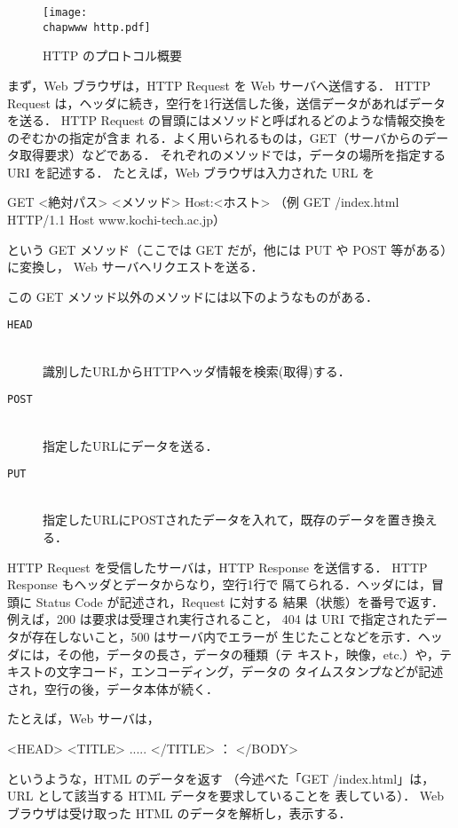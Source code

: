 \begin{figure}[ht]
 \begin{center}
  \texttt{[image: \\chapwww http.pdf]}
  \caption{HTTP のプロトコル概要}
  \label{fig:04:http}
 \end{center}
\end{figure}

まず，Web ブラウザは，HTTP Request を Web サーバへ送信する．
HTTP Request は，ヘッダに続き，空行を1行送信した後，送信データがあればデータを送る．
HTTP Request の冒頭にはメソッドと呼ばれるどのような情報交換をのぞむかの指定が含ま
れる．よく用いられるものは，GET（サーバからのデータ取得要求）などである．
それぞれのメソッドでは，データの場所を指定する URI を記述する．
たとえば，Web ブラウザは入力された URL を
\begin{cli}
GET <絶対パス> <メソッド> Host:<ホスト>
（例 GET /index.html HTTP/1.1 Host www.kochi-tech.ac.jp）
\end{cli}
という GET メソッド（ここでは GET だが，他には PUT や POST 等がある）に変換し，
Web サーバへリクエストを送る．

この GET メソッド以外のメソッドには以下のようなものがある．
\begin{description}
 \item[\texttt{HEAD}] \ \\
       識別したURLからHTTPヘッダ情報を検索(取得)する．
 \item[\texttt{POST}] \ \\
       指定したURLにデータを送る．
 \item[\texttt{PUT}]  \ \\
       指定したURLにPOSTされたデータを入れて，既存のデータを置き換える．
\end{description}

HTTP Request を受信したサーバは，HTTP Response を送信する．
HTTP Response もヘッダとデータからなり，空行1行で
隔てられる．ヘッダには，冒頭に Status Code が記述され，Request に対する
結果（状態）を番号で返す．例えば，200 は要求は受理され実行されること，
404 は URI で指定されたデータが存在しないこと，500 はサーバ内でエラーが
生じたことなどを示す．ヘッダには，その他，データの長さ，データの種類（テ
キスト，映像，etc.）や，テキストの文字コード，エンコーディング，データの
タイムスタンプなどが記述され，空行の後，データ本体が続く．

たとえば，Web サーバは，
\begin{cli}
<HEAD>
<TITLE> ..... </TITLE>
：
</BODY>
\end{cli}
というような，HTML のデータを返す
（今述べた「GET /index.html」は，URL として該当する HTML データを要求していることを
表している）．
Web ブラウザは受け取った HTML のデータを解析し，表示する．

